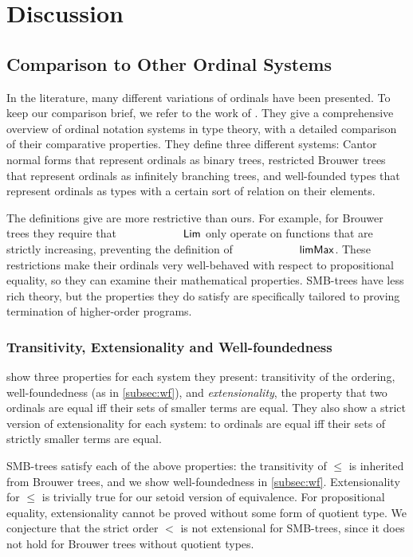 
\section{Discussion}
\label{sec:discussion}

\subsection{Comparison to Other Ordinal Systems}

In the literature, many different variations of ordinals have been presented.
To keep our comparison brief, we refer to the work of
\citet{KRAUS2023113843}.
They give a comprehensive overview
of ordinal notation systems in type theory, with a detailed
comparison of their comparative properties.
They define three different systems: Cantor normal forms
that represent ordinals as binary trees, restricted Brouwer trees that represent
ordinals as infinitely branching trees, and well-founded types
that represent ordinals as types with a certain sort of relation on
their elements.


The definitions \citeauthor{KRAUS2023113843} give are more restrictive than
ours. For example, for Brouwer trees they require that $\Lim$ only operate
on functions that are strictly increasing, preventing
the definition of $\limMax$. These restrictions
make their ordinals very well-behaved with respect to propositional equality,
so they can
examine their mathematical properties.
SMB-trees have less rich theory, but the properties
they do satisfy are specifically tailored to proving
termination of higher-order programs.

\subsubsection{Transitivity, Extensionality and Well-foundedness}
 show three properties for each system they present:
transitivity of the ordering, well-foundedness (as in \cref{subsec:wf}),
and \textit{extensionality}, the property that two ordinals are equal
iff their sets of smaller terms are equal. They also show a strict version
of extensionality for each system: to ordinals are equal iff their sets of
strictly smaller terms are equal.

SMB-trees satisfy each of the above properties: the transitivity of $\le$
is inherited from Brouwer trees, and we show well-foundedness in \cref{subsec:wf}.
Extensionality for $\le$ is trivially true for our setoid version of equivalence.
For propositional equality, extensionality cannot be proved without some form of quotient type.
We conjecture that the strict order $<$  is not extensional for SMB-trees,
since it does not hold for Brouwer trees without quotient types.


